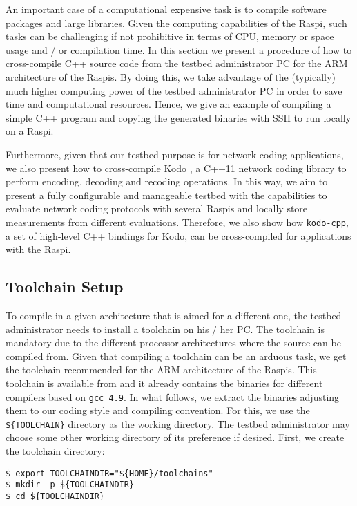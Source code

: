 \label{sec:cross_compilation}
An important case of a computational expensive task is to compile software
packages and large libraries. Given the computing capabilities of the
\ac{Raspi}, such tasks can be challenging if not prohibitive in terms of
\ac{CPU}, memory or space usage and / or compilation time. In
this section we present a procedure of how to cross-compile C++
source code from the testbed administrator \ac{PC} for the \ac{ARM}
architecture of the \ac{Raspi}s. By doing this, we take advantage
of the (typically) much higher computing power of the testbed
administrator \ac{PC} in order to save time and computational resources.
Hence, we give an example of compiling a simple C++ program and
copying the generated binaries with \ac{SSH} to run locally
on a \ac{Raspi}.

Furthermore, given that our testbed purpose is for
network coding applications, we also present how to cross-compile Kodo
\cite{kodo2011pedersen}, a C++11 network coding library to perform
encoding, decoding and recoding operations. In this way, we aim to present
a fully configurable and manageable testbed with the capabilities to
evaluate network coding protocols with several \ac{Raspi}s and locally
store measurements from different evaluations. Therefore, we also show
how \texttt{kodo-cpp}, a set of high-level C++ bindings for Kodo, can be
cross-compiled for applications with the \ac{Raspi}.

\subsection{Toolchain Setup}
To compile in a given architecture that is aimed for a different one,
the testbed administrator needs to install a toolchain on his / her \ac{PC}.
The toolchain is mandatory due to the different processor architectures
where the source can be compiled from.
Given that compiling a toolchain can be an arduous task, we get the toolchain
recommended for the \ac{ARM} architecture of the \ac{Raspi}s.
This toolchain is available from \cite{soerensen_chres_wiant_2016_154143} and
it already contains the binaries for different compilers based on
\texttt{gcc 4.9}. In what follows, we extract the binaries adjusting
them to our coding style and compiling convention. For this, we use the
\texttt{\$\{TOOLCHAIN\}} directory as the working directory.
The testbed administrator may choose some other working directory of
its preference if desired. First, we create the toolchain directory:

\begin{lstlisting}[]
$ export TOOLCHAINDIR="${HOME}/toolchains"
$ mkdir -p ${TOOLCHAINDIR}
$ cd ${TOOLCHAINDIR}
\end{lstlisting}
\FloatBarrier
\vspace{-5mm}

